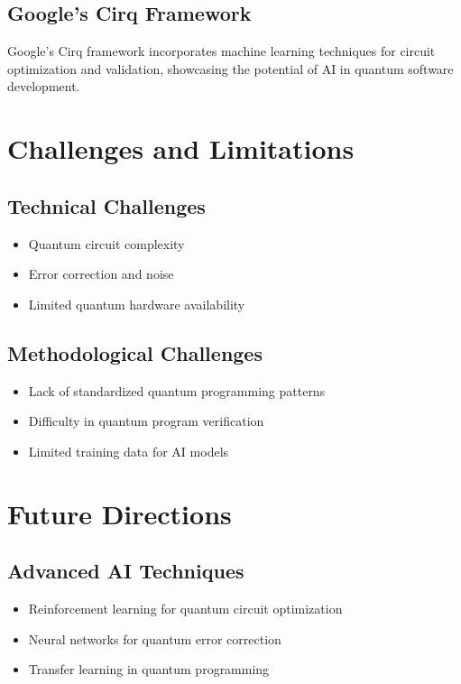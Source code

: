 \documentclass[12pt,a4paper]{article}
\begin{document}
\subsection{Google's Cirq Framework}
Google's Cirq framework incorporates machine learning techniques for circuit optimization and validation, showcasing the potential of AI in quantum software development.

\section{Challenges and Limitations}
\subsection{Technical Challenges}
\begin{itemize}
    \item Quantum circuit complexity
    \item Error correction and noise
    \item Limited quantum hardware availability
\end{itemize}

\subsection{Methodological Challenges}
\begin{itemize}
    \item Lack of standardized quantum programming patterns
    \item Difficulty in quantum program verification
    \item Limited training data for AI models
\end{itemize}

\section{Future Directions}
\subsection{Advanced AI Techniques}
\begin{itemize}
    \item Reinforcement learning for quantum circuit optimization
    \item Neural networks for quantum error correction
    \item Transfer learning in quantum programming
\end{itemize}
\end{document}
